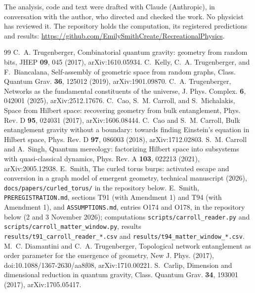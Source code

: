 \documentclass[aps,pre,10pt,twocolumn,superscriptaddress,nofootinbib]{revtex4-2}
\begin{document}
\begin{acknowledgments}
The analysis, code and text were drafted with Claude (Anthropic), in conversation with the author, who directed and
checked the work. No physicist has reviewed it. The repository holds the computation, its registered predictions and
results: \url{https://github.com/EmilySmithCreate/RecreationalPhysics}.
\end{acknowledgments}

\begin{thebibliography}{99}
 C.~A. Trugenberger, Combinatorial quantum gravity: geometry from random bits, JHEP \textbf{09}, 045
(2017), arXiv:1610.05934.
 C.~Kelly, C.~A. Trugenberger, and F.~Biancalana, Self-assembly of geometric space from random graphs,
Class. Quantum Grav. \textbf{36}, 125012 (2019), arXiv:1901.09870.
 C.~A. Trugenberger, Networks as the fundamental constituents of the universe, J. Phys. Complex.
\textbf{6}, 042001 (2025), arXiv:2512.17676.
 C.~Cao, S.~M. Carroll, and S.~Michalakis, Space from Hilbert space: recovering geometry from bulk
entanglement, Phys. Rev. D \textbf{95}, 024031 (2017), arXiv:1606.08444.
 C.~Cao and S.~M. Carroll, Bulk entanglement gravity without a boundary: towards finding Einstein's
equation in Hilbert space, Phys. Rev. D \textbf{97}, 086003 (2018), arXiv:1712.02803.
 S.~M. Carroll and A.~Singh, Quantum mereology: factorizing Hilbert space into subsystems with
quasi-classical dynamics, Phys. Rev. A \textbf{103}, 022213 (2021), arXiv:2005.12938.
 E.~Smith, The curled torus burps: activated escape and conversion in a graph model of emergent
geometry, technical manuscript (2026), \texttt{docs/papers/curled\_torus/} in the repository below.
 E.~Smith, \texttt{PREREGISTRATION.md}, sections T91 (with Amendment 1) and T94 (with Amendment 1),
and \texttt{ASSUMPTIONS.md}, entries O174 and O178, in the repository below (2 and 3 November 2026); computations
\texttt{scripts/carroll\_reader.py} and \texttt{scripts/carroll\_matter\_window.py}, results
\texttt{results/t91\_carroll\_reader\_*.csv} and \texttt{results/t94\_matter\_window\_*.csv}.
 M.~C. Diamantini and C.~A. Trugenberger, Topological network entanglement as order parameter for the
emergence of geometry, New J. Phys. (2017), doi:10.1088/1367-2630/aa8f08, arXiv:1710.00221.
 S.~Carlip, Dimension and dimensional reduction in quantum gravity, Class. Quantum Grav.
\textbf{34}, 193001 (2017), arXiv:1705.05417.
\end{thebibliography}
\end{document}
